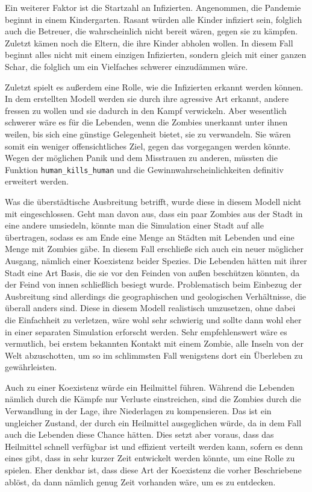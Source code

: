     Ein weiterer Faktor ist die Startzahl an Infizierten. Angenommen, die Pandemie beginnt in einem Kindergarten. Rasant würden alle Kinder infiziert sein, folglich auch die Betreuer, die wahrscheinlich nicht bereit wären, gegen sie zu kämpfen. Zuletzt kämen noch die Eltern, die ihre Kinder abholen wollen. In diesem Fall beginnt alles nicht mit einem einzigen Infizierten, sondern gleich mit einer ganzen Schar, die folglich um ein Vielfaches schwerer einzudämmen wäre.

    Zuletzt spielt es außerdem eine Rolle, wie die Infizierten erkannt werden können. In dem erstellten Modell werden sie durch ihre agressive Art erkannt, andere fressen zu wollen und sie dadurch in den Kampf verwickeln. Aber wesentlich schwerer wäre es für die Lebenden, wenn die Zombies unerkannt unter ihnen weilen, bis sich eine günstige Gelegenheit bietet, sie zu verwandeln. Sie wären somit ein weniger offensichtliches Ziel, gegen das vorgegangen werden könnte. Wegen der möglichen Panik und dem Misstrauen zu anderen, müssten die Funktion \texttt{human\_kills\_human} und die Gewinnwahrscheinlichkeiten definitiv erweitert werden.

    Was die überstädtische Ausbreitung betrifft, wurde diese in diesem Modell nicht mit eingeschlossen. Geht man davon aus, dass ein paar Zombies aus der Stadt in eine andere umsiedeln, könnte man die Simulation einer Stadt auf alle übertragen, sodass es am Ende eine Menge an Städten mit Lebenden und eine Menge mit Zombies gäbe. In diesem Fall erschließe sich auch ein neuer möglicher Ausgang, nämlich einer Koexistenz beider Spezies. Die Lebenden hätten mit ihrer Stadt eine Art Basis, die sie vor den Feinden von außen beschützen könnten, da der Feind von innen schließlich besiegt wurde. Problematisch beim Einbezug der Ausbreitung sind allerdings die geographischen und geologischen Verhältnisse, die überall anders sind. Diese in diesem Modell realistisch umzusetzen, ohne dabei die Einfachheit zu verletzen, wäre wohl sehr schwierig und sollte dann wohl eher in einer separaten Simulation erforscht werden. Sehr empfehlenswert wäre es vermutlich, bei erstem bekannten Kontakt mit einem Zombie, alle Inseln von der Welt abzuschotten, um so im schlimmsten Fall wenigstens dort ein Überleben zu gewährleisten.

    Auch zu einer Koexistenz würde ein Heilmittel führen. Während die Lebenden nämlich durch die Kämpfe nur Verluste einstreichen, sind die Zombies durch die Verwandlung in der Lage, ihre Niederlagen zu kompensieren. Das ist ein ungleicher Zustand, der durch ein Heilmittel ausgeglichen würde, da in dem Fall auch die Lebenden diese Chance hätten. Dies setzt aber voraus, dass das Heilmittel schnell verfügbar ist und effizient verteilt werden kann, sofern es denn eines gibt, dass in sehr kurzer Zeit entwickelt werden könnte, um eine Rolle zu spielen. Eher denkbar ist, dass diese Art der Koexistenz die vorher Beschriebene ablöst, da dann nämlich genug Zeit vorhanden wäre, um es zu entdecken.

